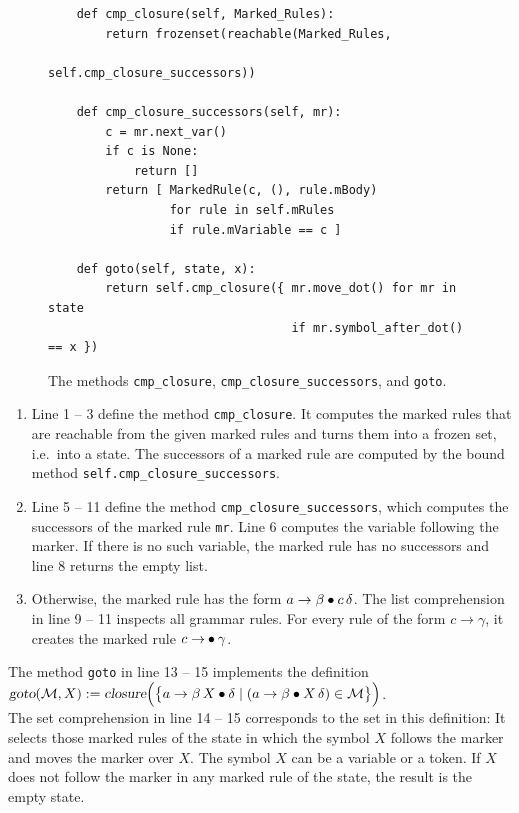 \begin{figure}[!ht]
\centering
\begin{verbatim}
    def cmp_closure(self, Marked_Rules):
        return frozenset(reachable(Marked_Rules,
                                   self.cmp_closure_successors))

    def cmp_closure_successors(self, mr):
        c = mr.next_var()
        if c is None:
            return []
        return [ MarkedRule(c, (), rule.mBody)
                 for rule in self.mRules
                 if rule.mVariable == c ]

    def goto(self, state, x):
        return self.cmp_closure({ mr.move_dot() for mr in state
                                  if mr.symbol_after_dot() == x })
\end{verbatim}
\vspace*{-0.3cm}
\caption{The methods \texttt{cmp\_closure}, \texttt{cmp\_closure\_successors}, and \texttt{goto}.}
\label{fig:04-SLR-Table-Generator.ipynb:cmp_closure}
\end{figure}

\begin{enumerate}
\item Line 1 -- 3 define the method \texttt{cmp\_closure}.  It computes the marked rules that are reachable from the
      given marked rules and turns them into a frozen set, i.e.~into a state.  The successors of a marked rule are
      computed by the bound method \texttt{self.cmp\_closure\_successors}.
\item Line 5 -- 11 define the method \texttt{cmp\_closure\_successors}, which computes the successors of the
      marked rule \texttt{mr}.  Line 6 computes the variable following the marker.  If there is no such variable,
      the marked rule has no successors and line 8 returns the empty list.
\item Otherwise, the marked rule has the form $a \rightarrow \beta \mdot c\, \delta$.  The list comprehension in
      line 9 -- 11 inspects all grammar rules.  For every rule of the form $c \rightarrow \gamma$, it creates the
      marked rule $c \rightarrow \mdot \gamma$.
\end{enumerate}
The method \texttt{goto} in line 13 -- 15 implements the definition
\\[0.2cm]
\hspace*{1.3cm}
$\textsl{goto}(\mathcal{M}, X) := \textsl{closure}\Bigl( \bigl\{
   a \rightarrow \beta\, X \mdot \delta \mid (a \rightarrow \beta \mdot X\, \delta) \in \mathcal{M}
   \bigr\} \Bigr)$.
\\[0.2cm]
The set comprehension in line 14 -- 15 corresponds to the set in this definition:  It selects those marked rules of
the state in which the symbol $X$ follows the marker and moves the marker over $X$.  The symbol $X$ can be a variable or a token.  If $X$ does not follow the
marker in any marked rule of the state, the result is the empty state.

